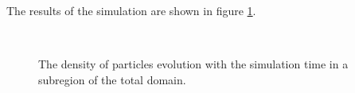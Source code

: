 \documentclass[a4paper]{article}
\begin{document}
The results of the simulation are shown in figure \ref{fig:simulation}.


\begin{figure}[htbp]
  \\
  \caption{The density of particles evolution with the simulation time in a subregion of the total domain.}
  \label{fig:simulation}
\end{figure}
\end{document}
